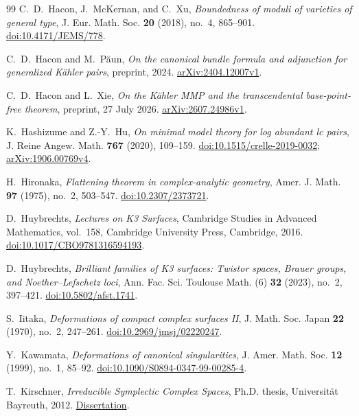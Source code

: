 \documentclass[11pt,a4paper]{article}
\numberwithin{equation}{section}
\theoremstyle{definition}
\theoremstyle{remark}
\begin{document}
\begin{thebibliography}{99}
C.~D.~Hacon, J.~McKernan, and C.~Xu,
\emph{Boundedness of moduli of varieties of general type},
J. Eur. Math. Soc. \textbf{20} (2018), no.~4, 865--901.
\href{https://doi.org/10.4171/JEMS/778}{doi:10.4171/JEMS/778}.

C.~D.~Hacon and M.~Păun,
\emph{On the canonical bundle formula and adjunction for generalized
Kähler pairs}, preprint, 2024.
\href{https://arxiv.org/abs/2404.12007v1}{arXiv:2404.12007v1}.

C.~D.~Hacon and L.~Xie,
\emph{On the Kähler MMP and the transcendental base-point-free theorem},
preprint, 27 July 2026.
\href{https://arxiv.org/abs/2607.24986v1}{arXiv:2607.24986v1}.

K.~Hashizume and Z.-Y.~Hu,
\emph{On minimal model theory for log abundant lc pairs},
J. Reine Angew. Math. \textbf{767} (2020), 109--159.
\href{https://doi.org/10.1515/crelle-2019-0032}{doi:10.1515/crelle-2019-0032};
\href{https://arxiv.org/abs/1906.00769v4}{arXiv:1906.00769v4}.

H.~Hironaka,
\emph{Flattening theorem in complex-analytic geometry},
Amer. J. Math. \textbf{97} (1975), no.~2, 503--547.
\href{https://doi.org/10.2307/2373721}{doi:10.2307/2373721}.

D.~Huybrechts,
\emph{Lectures on K3 Surfaces},
Cambridge Studies in Advanced Mathematics, vol.~158,
Cambridge University Press, Cambridge, 2016.
\href{https://doi.org/10.1017/CBO9781316594193}{doi:10.1017/CBO9781316594193}.

D.~Huybrechts,
\emph{Brilliant families of K3 surfaces: Twistor spaces, Brauer groups,
and Noether--Lefschetz loci},
Ann. Fac. Sci. Toulouse Math. (6) \textbf{32} (2023), no.~2, 397--421.
\href{https://doi.org/10.5802/afst.1741}{doi:10.5802/afst.1741}.

S.~Iitaka,
\emph{Deformations of compact complex surfaces II},
J. Math. Soc. Japan \textbf{22} (1970), no.~2, 247--261.
\href{https://doi.org/10.2969/jmsj/02220247}{doi:10.2969/jmsj/02220247}.

Y.~Kawamata,
\emph{Deformations of canonical singularities},
J. Amer. Math. Soc. \textbf{12} (1999), no.~1, 85--92.
\href{https://doi.org/10.1090/S0894-0347-99-00285-4}{doi:10.1090/S0894-0347-99-00285-4}.

T.~Kirschner,
\emph{Irreducible Symplectic Complex Spaces},
Ph.D. thesis, Universität Bayreuth, 2012.
\href{https://epub.uni-bayreuth.de/id/eprint/209/1/diss-kirschner-bibprint.pdf}{Dissertation}.


\end{thebibliography}
\end{document}
